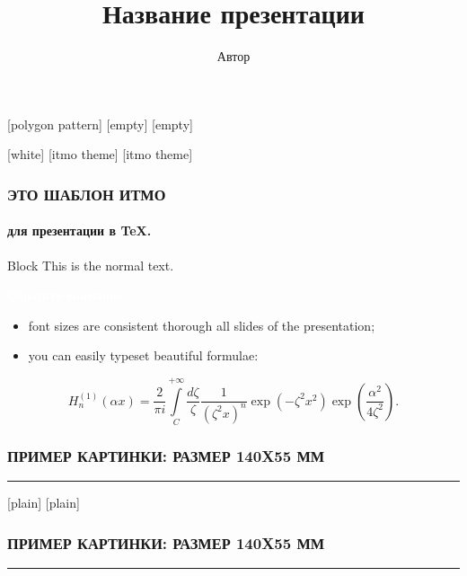 \documentclass[aspectratio=169, 14pt]{beamer}
\title{Название презентации}
\author{Автор}
\newcommand{\coloremph}[1]{\colorbox{itmo-red}{\textcolor{white}{\textbf{#1}}}}
\begin{document}

  [polygon pattern] %
  [empty] %
  [empty] %
  \frame{\titlepage}

  [white] %
  [itmo theme] %
  [itmo theme] %

  \begin{frame}
    \frametitle{\MakeUppercase{Это шаблон ИТМО}}
    \framesubtitle{{для презентации в {\rmfamily \TeX}.}}

    \begin{block}{Block}
      This is the normal text.
    \end{block}

    \coloremph{Обратите внимание!} 

    \begin{itemize}
      \item font sizes are consistent thorough all slides of the presentation;
      \item you can easily typeset beautiful formulae:
    \end{itemize}
    \begin{equation}
    H_{n}^{(1)}(\alpha x)=\frac{2}{\pi i}\int\limits_{C}^{+\infty}\frac{d\zeta}{\zeta}\frac{1}{(\zeta^{2}x)^{n}}\exp\left(-\zeta^{2}x^{2}\right)\exp\left(\frac{\alpha^{2}}{4\zeta^{2}}\right).
    \end{equation}
  \end{frame}

  \begin{frame}
    \frametitle{\MakeUppercase{Пример картинки: размер 140x55 мм}}
    \rule{140mm}{45mm}
  \end{frame}

  [plain] %
  [plain] %
  \begin{frame}
    \frametitle{\MakeUppercase{Пример картинки: размер 140x55 мм}}
    \rule{140mm}{45mm}
  \end{frame}
\end{document}
